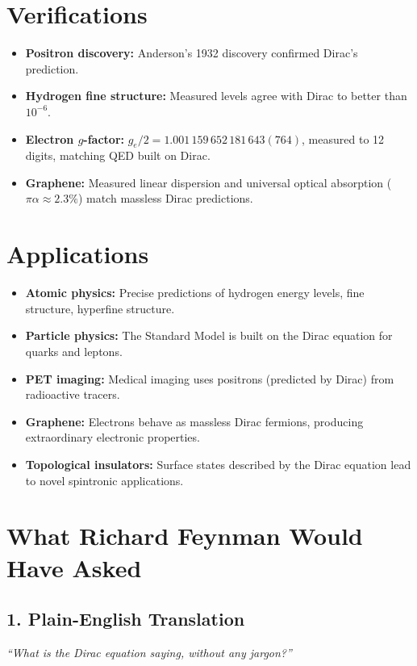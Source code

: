 \documentclass[11pt,openright]{book}
\begin{document}
\section*{Verifications}

\begin{itemize}
\item \textbf{Positron discovery:} Anderson's 1932 discovery confirmed Dirac's prediction.
\item \textbf{Hydrogen fine structure:} Measured levels agree with Dirac to better than $10^{-6}$.
\item \textbf{Electron $g$-factor:} $g_e/2 = 1.001\,159\,652\,181\,643(764)$, measured to 12 digits, matching QED built on Dirac.
\item \textbf{Graphene:} Measured linear dispersion and universal optical absorption ($\pi\alpha \approx 2.3\%$) match massless Dirac predictions.
\end{itemize}
\section*{Applications}

\begin{itemize}
\item \textbf{Atomic physics:} Precise predictions of hydrogen energy levels, fine structure, hyperfine structure.
\item \textbf{Particle physics:} The Standard Model is built on the Dirac equation for quarks and leptons.
\item \textbf{PET imaging:} Medical imaging uses positrons (predicted by Dirac) from radioactive tracers.
\item \textbf{Graphene:} Electrons behave as massless Dirac fermions, producing extraordinary electronic properties.
\item \textbf{Topological insulators:} Surface states described by the Dirac equation lead to novel spintronic applications.
\end{itemize}
\section*{What Richard Feynman Would Have Asked}

\subsection*{1. Plain-English Translation}
\textit{``What is the Dirac equation saying, without any jargon?''}
\end{document}
